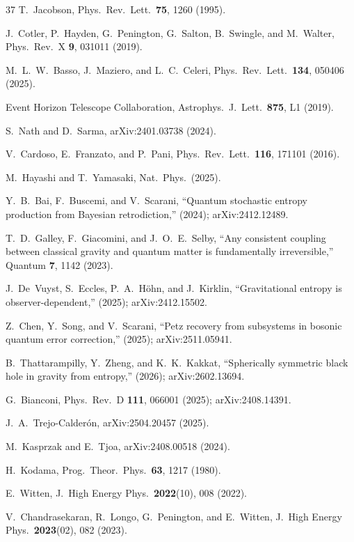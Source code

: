 \documentclass[prl,twocolumn,superscriptaddress,floatfix,nofootinbib]{revtex4-2}
\begin{document}
\begin{thebibliography}{37}
T.~Jacobson,
Phys.\ Rev.\ Lett.\ \textbf{75}, 1260 (1995).

J.~Cotler, P.~Hayden, G.~Penington, G.~Salton,
B.~Swingle, and M.~Walter,
Phys.\ Rev.\ X \textbf{9}, 031011 (2019).

M.~L.~W.~Basso, J.~Maziero, and L.~C.~Celeri,
Phys.\ Rev.\ Lett.\ \textbf{134}, 050406 (2025).

Event Horizon Telescope Collaboration,
Astrophys.\ J.\ Lett.\ \textbf{875}, L1 (2019).

S.~Nath and D.~Sarma,
arXiv:2401.03738 (2024).

V.~Cardoso, E.~Franzato, and P.~Pani,
Phys.\ Rev.\ Lett.\ \textbf{116}, 171101 (2016).

M.~Hayashi and T.~Yamasaki,
Nat.\ Phys.\ (2025).

Y.~B.~Bai, F.~Buscemi, and V.~Scarani,
``Quantum stochastic entropy production from Bayesian retrodiction,''
(2024); arXiv:2412.12489.

T.~D.~Galley, F.~Giacomini, and J.~O.~E.~Selby,
``Any consistent coupling between classical gravity and quantum matter is fundamentally irreversible,''
Quantum \textbf{7}, 1142 (2023).

J.~De~Vuyst, S.~Eccles, P.~A.~H\"{o}hn, and J.~Kirklin,
``Gravitational entropy is observer-dependent,''
(2025); arXiv:2412.15502.

Z.~Chen, Y.~Song, and V.~Scarani,
``Petz recovery from subsystems in bosonic quantum error correction,''
(2025); arXiv:2511.05941.

B.~Thattarampilly, Y.~Zheng, and K.~K.~Kakkat,
``Spherically symmetric black hole in gravity from entropy,''
(2026); arXiv:2602.13694.

G.~Bianconi,
Phys.\ Rev.\ D \textbf{111}, 066001 (2025);
arXiv:2408.14391.

J.~A.~Trejo-Calder\'{o}n,
arXiv:2504.20457 (2025).

M.~Kasprzak and E.~Tjoa,
arXiv:2408.00518 (2024).

H.~Kodama,
Prog.\ Theor.\ Phys.\ \textbf{63}, 1217 (1980).

E.~Witten,
J.\ High Energy Phys.\ \textbf{2022}(10), 008 (2022).

V.~Chandrasekaran, R.~Longo, G.~Penington, and E.~Witten,
J.\ High Energy Phys.\ \textbf{2023}(02), 082 (2023).

\end{thebibliography}
\end{document}
